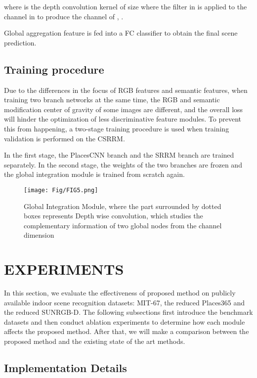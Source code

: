 \documentclass[conference]{IEEEtran}
\begin{document}
where  is the depth convolution kernel of size  where the  filter in  is applied to the  channel in  to produce the  channel of , .

Global aggregation feature  is fed into a FC classifier to obtain the final scene prediction.

\subsection{Training procedure}

Due to the differences in the focus of RGB features and semantic features, when training two branch networks at the same time, the RGB and semantic modification center of gravity of some images are different, and the overall loss will hinder the optimization of less discriminative feature modules. To prevent this from happening, a two-stage training procedure is used when training validation is performed on the CSRRM.

In the first stage, the PlacesCNN branch and the SRRM branch are trained separately. In the second stage, the weights of the two branches are frozen and the global integration module is trained from scratch again.

\begin{figure*}[htbp]
    \centering
    \texttt{[image: Fig/FIG5.png]}
    \caption{Global Integration Module, where the part surrounded by dotted boxes represents Depth wise convolution, which studies the complementary information of two global nodes from the channel dimension}
    \label{Fig5}
\end{figure*}

\section{EXPERIMENTS}

In this section, we evaluate the effectiveness of proposed method on publicly available indoor scene recognition datasets: MIT-67\cite{ref8}, the reduced Places365\cite{ref14} and the reduced SUNRGB-D\cite{ref30}. The following subsections first introduce the benchmark datasets and then conduct ablation experiments to determine how each module affects the proposed method. After that, we will make a comparison between the proposed method and the existing state of the art methods.

\subsection{Implementation Details}
\end{document}

